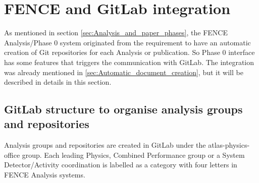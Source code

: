 
\section{FENCE and GitLab integration}%
\label{sec:FENCE_and_Gitlab_integration}

As mentioned in section \cref{sec:Analysis_and_paper_phases}, the FENCE Analysis/Phase 0 system originated from the requirement to have an automatic creation of Git repositories for each Analysis or publication. So Phase 0 interface has some features that triggers the communication with GitLab. The integration was already mentioned in \ref{sec:Automatic_document_creation}, but it will be described in details in this section.

\subsection{GitLab structure to organise analysis groups and repositories}%
\label{sec:Gitlab_structure_to_organise_Analysis_groups_and_repositories}

Analysis groups and repositories are created in GitLab under the atlas-physics-office group. Each leading Physics, Combined Performance group or a System Detector/Activity coordination is labelled as a category with four letters in FENCE Analysis systems.

